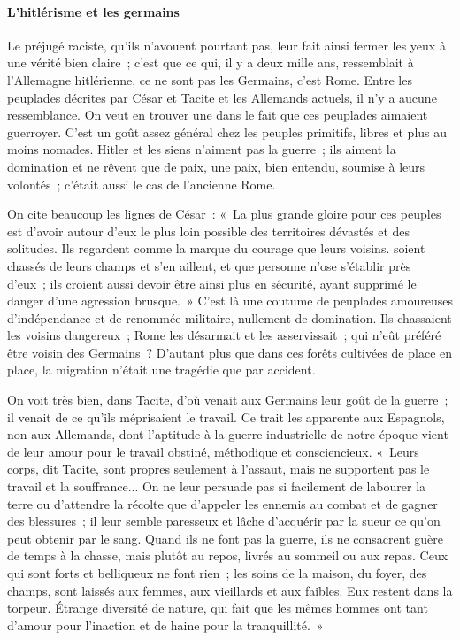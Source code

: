 \documentclass[french,twoside]{book} %
\begin{document}
\paragraph[{L'hitlérisme et les germains}]{L'hitlérisme et les germains}
\noindent Le préjugé raciste, qu'ils n'avouent pourtant pas, leur fait ainsi fermer les yeux à une vérité bien claire ; c'est que ce qui, il y a deux mille ans, ressem­blait à l'Allemagne hitlérienne, ce ne sont pas les Germains, c'est Rome. Entre les peuplades décrites par César et Tacite et les Allemands actuels, il n'y a aucune ressemblance. On veut en trouver une dans le fait que ces peuplades aimaient guerroyer. C'est un goût assez général chez les peuples primitifs, libres et plus au moins nomades. Hitler et les siens n'aiment pas la guerre ; ils aiment la domination et ne rêvent que de paix, une paix, bien entendu, soumise à leurs volontés ; c'était aussi le cas de l'ancienne Rome.\par
On cite beaucoup les lignes de César : « La plus grande gloire pour ces peuples est d'avoir autour d'eux le plus loin possible des territoires dévastés et des solitudes. Ils regardent comme la marque du courage que leurs voisins. soient chassés de leurs champs et s'en aillent, et que personne n'ose s'établir près d'eux ; ils croient aussi devoir être ainsi plus en sécurité, ayant supprimé le danger d'une agression brusque. » C'est là une coutume de peuplades amou­reuses d'indépendance et de renommée militaire, nullement de domination. Ils chassaient les voisins dangereux ; Rome les désarmait et les asservissait ; qui n'eût préféré être voisin des Germains ? D'autant plus que dans ces forêts cultivées de place en place, la migration n'était une tragédie que par accident.\par
On voit très bien, dans Tacite, d'où venait aux Germains leur goût de la guerre ; il venait de ce qu'ils méprisaient le travail. Ce trait les apparente aux Espagnols, non aux Allemands, dont l'aptitude à la guerre industrielle de notre époque vient de leur amour pour le travail obstiné, méthodique et conscien­cieux. « Leurs corps, dit Tacite, sont propres seulement à l'assaut, mais ne supportent pas le travail et la souffrance... On ne leur persuade pas si facile­ment de labourer la terre ou d'attendre la récolte que d'appeler les ennemis au combat et de gagner des blessures ; il leur semble paresseux et lâche d'acquérir par la sueur ce qu'on peut obtenir par le sang. Quand ils ne font pas la guerre, ils ne consacrent guère de temps à la chasse, mais plutôt au repos, livrés au sommeil ou aux repas. Ceux qui sont forts et belliqueux ne font rien ; les soins de la maison, du foyer, des champs, sont laissés aux femmes, aux vieillards et aux faibles. Eux restent dans la torpeur. Étrange diversité de nature, qui fait que les mêmes hommes ont tant d'amour pour l'inaction et de haine pour la tranquillité. »\par
\end{document}
